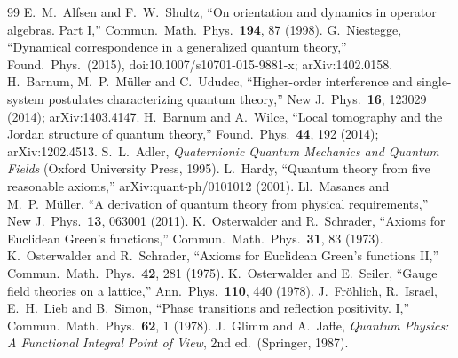 \documentclass[11pt]{article}
\theoremstyle{remark}
\begin{document}
\begin{thebibliography}{99}
 E.~M.~Alfsen and F.~W.~Shultz, ``On orientation and dynamics in operator algebras. Part I,'' Commun.\ Math.\ Phys.\ \textbf{194}, 87 (1998).
 G.~Niestegge, ``Dynamical correspondence in a generalized quantum theory,'' Found.\ Phys.\ (2015), doi:10.1007/s10701-015-9881-x; arXiv:1402.0158.
 H.~Barnum, M.~P.~M\"uller and C.~Ududec, ``Higher-order interference and single-system postulates characterizing quantum theory,'' New J.\ Phys.\ \textbf{16}, 123029 (2014); arXiv:1403.4147.
 H.~Barnum and A.~Wilce, ``Local tomography and the Jordan structure of quantum theory,'' Found.\ Phys.\ \textbf{44}, 192 (2014); arXiv:1202.4513.
 S.~L.~Adler, \emph{Quaternionic Quantum Mechanics and Quantum Fields} (Oxford University Press, 1995).
 L.~Hardy, ``Quantum theory from five reasonable axioms,'' arXiv:quant-ph/0101012 (2001).
 Ll.~Masanes and M.~P.~M\"uller, ``A derivation of quantum theory from physical requirements,'' New J.\ Phys.\ \textbf{13}, 063001 (2011).
 K.~Osterwalder and R.~Schrader, ``Axioms for Euclidean Green's functions,'' Commun.\ Math.\ Phys.\ \textbf{31}, 83 (1973).
 K.~Osterwalder and R.~Schrader, ``Axioms for Euclidean Green's functions II,'' Commun.\ Math.\ Phys.\ \textbf{42}, 281 (1975).
 K.~Osterwalder and E.~Seiler, ``Gauge field theories on a lattice,'' Ann.\ Phys.\ \textbf{110}, 440 (1978).
 J.~Fr\"ohlich, R.~Israel, E.~H.~Lieb and B.~Simon, ``Phase transitions and reflection positivity. I,'' Commun.\ Math.\ Phys.\ \textbf{62}, 1 (1978).
 J.~Glimm and A.~Jaffe, \emph{Quantum Physics: A Functional Integral Point of View}, 2nd ed.\ (Springer, 1987).
\end{thebibliography}
\end{document}
